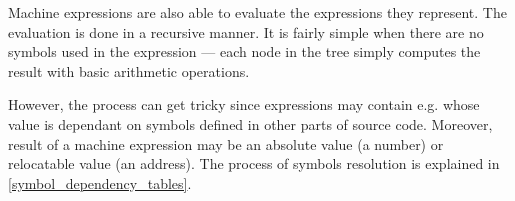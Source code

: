 Machine expressions are also able to evaluate the expressions they represent. The evaluation is done in a recursive manner. It is fairly simple when there are no symbols used in the expression --- each node in the tree simply computes the result with basic arithmetic operations.

However, the process can get tricky since expressions may contain e.g.  whose value is dependant on symbols defined in other parts of source code. Moreover, result of a machine expression may be an absolute value (a number) or relocatable value (an address). The process of symbols resolution is explained in \cref{symbol_dependency_tables}.

